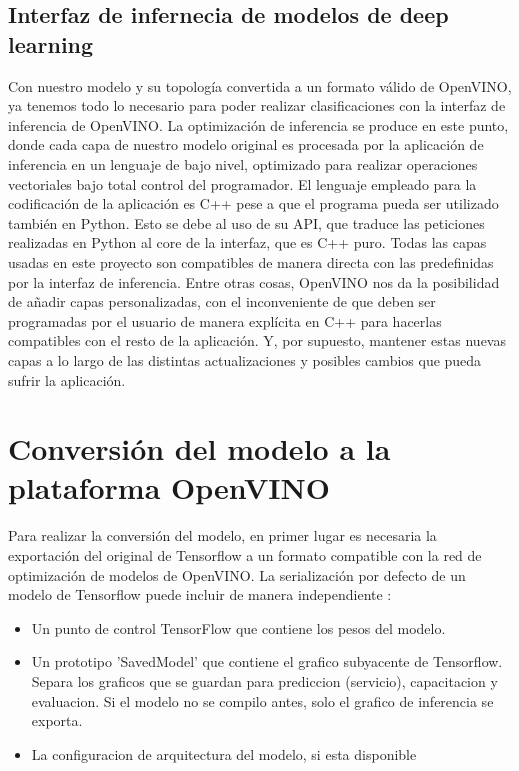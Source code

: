 \subsection{Interfaz de infernecia de modelos de deep learning}\label{subsec:interfaz-de-infernecia-de-modelos-de-deep-learning}
Con nuestro modelo y su topología convertida a un formato válido de OpenVINO, ya tenemos todo lo necesario para poder realizar clasificaciones con la interfaz de inferencia de OpenVINO.
La optimización de inferencia se produce en este punto, donde cada capa de nuestro modelo original es procesada por la aplicación de inferencia en un lenguaje de bajo nivel, optimizado para realizar operaciones vectoriales bajo total control del programador.
El lenguaje empleado para la codificación de la aplicación es C++ pese a que el programa pueda ser utilizado también en Python.
Esto se debe al uso de su API, que traduce las peticiones realizadas en Python al core de la interfaz, que es C++ puro.
Todas las capas usadas en este proyecto son compatibles de manera directa con las predefinidas por la interfaz de inferencia.
Entre otras cosas, OpenVINO nos da la posibilidad de añadir capas personalizadas, con el inconveniente de que deben ser programadas por el usuario de manera explícita en C++ para hacerlas compatibles con el resto de la aplicación. Y, por supuesto, mantener estas nuevas capas a lo largo de las distintas actualizaciones y posibles cambios que pueda sufrir la aplicación.


\section{Conversión del modelo a la plataforma OpenVINO}\label{sec:conversión-del-modelo-a-la-plataforma-OpenVINO}
Para realizar la conversión del modelo, en primer lugar es necesaria la exportación del original de Tensorflow a un formato compatible con la red de optimización de modelos de OpenVINO.
La serialización por defecto de un modelo de Tensorflow puede incluir de manera independiente :

\begin{itemize}
    \item Un punto de control TensorFlow que contiene los pesos del modelo.
    \item Un prototipo 'SavedModel' que contiene el grafico subyacente de Tensorflow.
    Separa los graficos que se guardan para prediccion (servicio), capacitacion y evaluacion.
    Si el modelo no se compilo antes, solo el grafico de inferencia se exporta.
    \item La configuracion de arquitectura del modelo, si esta disponible
\end{itemize}

